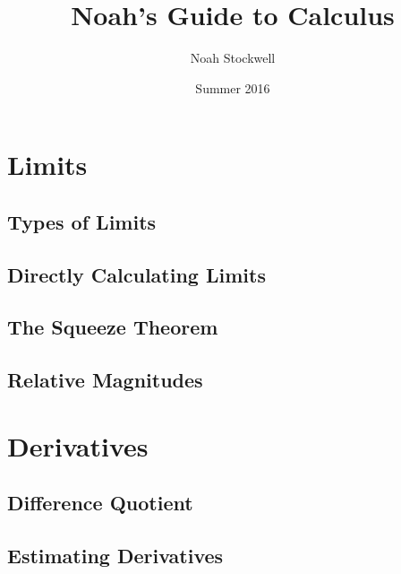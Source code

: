 \documentclass{article}
\title{Noah's Guide to Calculus}
\author{Noah Stockwell}
\date{Summer 2016}
\begin{document}
\maketitle
\vspace{2in}
\begin{center}\end{center}
\newpage
\tableofcontents
\newpage

\section{Limits} 
\subsection{Types of Limits}  
\subsection{Directly Calculating Limits} 
\subsection{The Squeeze Theorem} 
\subsection{Relative Magnitudes} 

\section{Derivatives} 
\subsection{Difference Quotient} 
\subsection{Estimating Derivatives}
\end{document}

